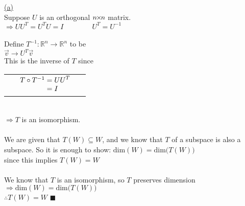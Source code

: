 \documentclass[12pt]{article}
\newcommand{\timesSmall}{{\mkern-2mu\times\mkern-2mu}}
\newcommand{\R}{\mathbb{R}}
\renewcommand{\qed}{\hfill$\blacksquare$}
\begin{document}
\hyperlink{toc}{\hypertarget{2.1}{(a)}}\\
Suppose $U$ is an orthogonal $n\timesSmall n$ matrix. \\
$\Longrightarrow U U^T= U^T U = I \qquad \qquad U^T = U^{-1}$
\\\\
Define $T^{-1} : \R^n \rightarrow \R^n$ to be \\
$\vec{v} \rightarrow U^T\vec{v}$\\
This is the inverse of $T$ since
\\
\begin{tabularx}{\textwidth}{>{\centering\arraybackslash}X >{\centering\arraybackslash}X}
	{\setstretch{1.5}$\begin{array}{r@{}>{\displaystyle}ll}
				T^{-1} \circ T & {}=U^T U & \text{} \\
				               & {}=I     & \text{} \\
			\end{array}$} &
	{\setstretch{1.5}$\begin{array}{r@{}>{\displaystyle}ll}
					T \circ T^{-1} & {}=U U^T & \text{} \\
					               & {}=I     & \text{} \\
				\end{array}$}
\end{tabularx}
\\
$\Longrightarrow T$ is an isomorphism.
\\\\
We are given that $T(W) \subseteq W$, and we know that $T$ of a subspace is also a subspace.
So it is enough to show: $\text{dim}(W) = \text{dim}\big(T(W)\big)$\\
since this implies $T(W) = W$
\\\\
We know that $T$ is an isomorphism, so $T$ preserves dimension\\
$\Longrightarrow \text{dim}(W) = \text{dim}\big(T(W)\big)$\\
$\therefore T(W) = W$ \qed
\\\\
\end{document}
